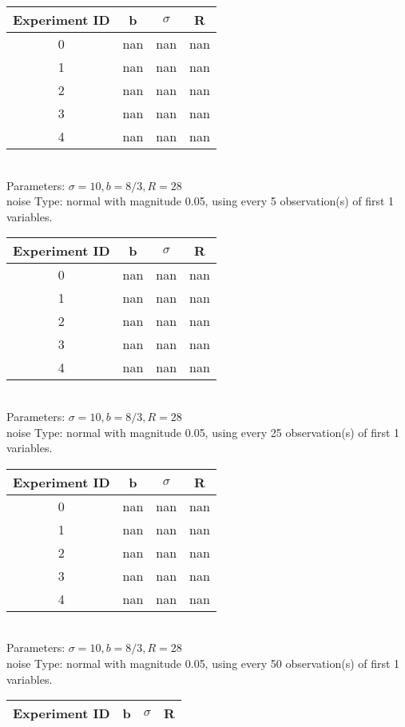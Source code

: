\begin{multicols}{3}
\begin{tabular}{cccc}
\hline Experiment ID & b & $\sigma$ & R \\ \hline 
0 & nan & nan & nan\\ \hline 
 1 & nan & nan & nan\\ \hline 
 2 & nan & nan & nan\\ \hline 
 3 & nan & nan & nan\\ \hline 
 4 & nan & nan & nan\\ \hline 
 \end{tabular}\\
Parameters: $\sigma=10, b=8/3, R=28$\\
noise Type: normal with magnitude 0.05, using every 5 observation(s) of first 1 variables.\\
\begin{tabular}{cccc}
\hline Experiment ID & b & $\sigma$ & R \\ \hline 
0 & nan & nan & nan\\ \hline 
 1 & nan & nan & nan\\ \hline 
 2 & nan & nan & nan\\ \hline 
 3 & nan & nan & nan\\ \hline 
 4 & nan & nan & nan\\ \hline 
 \end{tabular}\\
Parameters: $\sigma=10, b=8/3, R=28$\\
noise Type: normal with magnitude 0.05, using every 25 observation(s) of first 1 variables.\\
\begin{tabular}{cccc}
\hline Experiment ID & b & $\sigma$ & R \\ \hline 
0 & nan & nan & nan\\ \hline 
 1 & nan & nan & nan\\ \hline 
 2 & nan & nan & nan\\ \hline 
 3 & nan & nan & nan\\ \hline 
 4 & nan & nan & nan\\ \hline 
 \end{tabular}\\
Parameters: $\sigma=10, b=8/3, R=28$\\
noise Type: normal with magnitude 0.05, using every 50 observation(s) of first 1 variables.\\
\begin{tabular}{cccc}
\hline Experiment ID & b & $\sigma$ & R \\ \hline 

\end{tabular}
\end{multicols}
